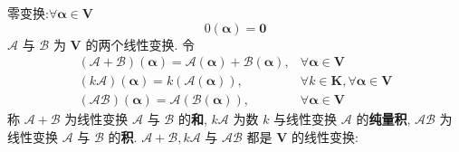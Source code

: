 \documentclass{article}
\begin{document}
				零变换:$\forall\boldsymbol \alpha \in \boldsymbol V$
				$$
				0(\boldsymbol{\alpha})=\mathbf{0}
				$$
				$\mathscr{A}$ 与 $\mathscr{B}$ 为 $\boldsymbol V$ 的两个线性变换. 令
				$$
				\begin{array}{ll}
					(\mathscr{A}+\mathscr{B})(\boldsymbol{\alpha})=\mathscr{A}(\boldsymbol{\alpha})+\mathscr{B}(\boldsymbol{\alpha}), & \forall \boldsymbol{\alpha} \in \boldsymbol V \\
					(k \mathscr{A})(\boldsymbol{\alpha})=k(\mathscr{A}(\boldsymbol{\alpha})), & \forall k \in \mathbf K, \forall \boldsymbol{\alpha} \in \boldsymbol V\\
					(\mathscr{A} \mathscr{B})(\boldsymbol{\alpha})=\mathscr{A}(\mathscr{B}(\boldsymbol{\alpha})), & \forall \boldsymbol{\alpha} \in \boldsymbol V
				\end{array}
				$$
				称 $\mathscr{A}+\mathscr{B}$ 为线性变换 $\mathscr{A}$ 与 $\mathscr{B}$ 的\textbf{和}, $k \mathscr{A}$ 为数 $k$ 与线性变换 $\mathscr{A}$ 的\textbf{纯量积}, $\mathscr{A} \mathscr{B}$ 为线性变换 $\mathscr{A}$ 与 $\mathscr{B}$ 的\textbf{积}. $\mathscr{A}+\mathscr{B}, k \mathscr{A}$ 与 $\mathscr{A} \mathscr{B}$ 都是 $\boldsymbol V$ 的线性变换:
\end{document}
